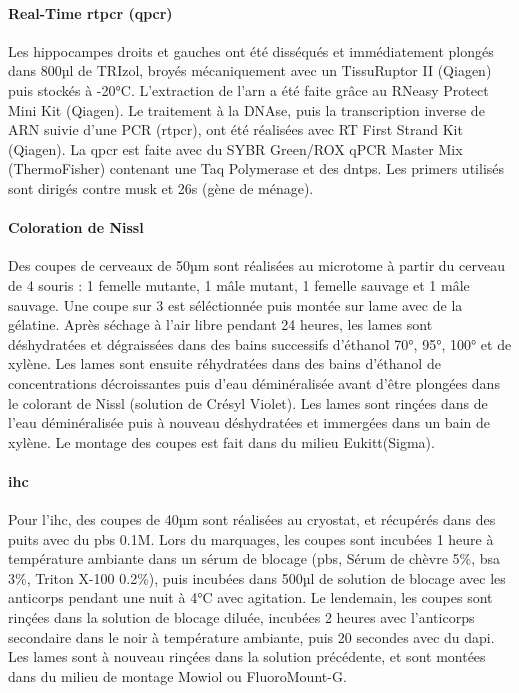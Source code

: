 \paragraph{Real-Time \acrshort{rtpcr} (\acrshort{qpcr})}
\label{par:qPCR}
	Les hippocampes droits et gauches ont été disséqués et immédiatement plongés dans 800µl de TRIzol\textregistered, broyés mécaniquement avec un TissuRuptor II (Qiagen\textregistered) puis stockés à -20°C. L'extraction de l'\acrshort{arn} a été faite grâce au RNeasy Protect Mini Kit (Qiagen\textregistered). Le traitement à la DNAse, puis la transcription inverse de ARN suivie d'une PCR (\acrshort{rtpcr}), ont été réalisées avec RT First Strand Kit (Qiagen\textregistered). La \gls{qpcr} est faite avec du SYBR Green/ROX qPCR Master Mix (ThermoFisher\textregistered) contenant une Taq Polymerase et des \glspl{dntp}. Les primers utilisés sont dirigés contre \gls{musk} et \acrshort{26s} (gène de ménage).
	
\paragraph{Coloration de Nissl}
\label{par:Nissl}
	Des coupes de cerveaux de 50µm sont réalisées au microtome à partir du cerveau de 4 souris : 1 femelle mutante, 1 mâle mutant, 1 femelle sauvage et 1 mâle sauvage. Une coupe sur 3 est séléctionnée puis montée sur lame avec de la gélatine. Après séchage à l'air libre pendant 24 heures, les lames sont déshydratées et dégraissées dans des bains successifs d'éthanol 70°, 95°, 100° et de xylène. Les lames sont ensuite réhydratées dans des bains d'éthanol de concentrations décroissantes puis d'eau déminéralisée avant d'être plongées dans le colorant de Nissl (solution de Crésyl Violet).  Les lames sont rinçées dans de l'eau déminéralisée puis à nouveau déshydratées et immergées dans un bain de xylène. Le montage des coupes est fait dans du milieu Eukitt\textregistered (Sigma).
	
\paragraph{\Acrlong{ihc}}	
\label{par:ihc}
	Pour l'\Gls{ihc}, des coupes de 40µm sont réalisées au cryostat, et récupérés dans des puits avec du \acrshort{pbs} 0.1M. Lors du marquages, les coupes sont incubées 1 heure à température ambiante dans un sérum de blocage (\acrshort{pbs}, Sérum de chèvre 5\%, \acrshort{bsa} 3\%, Triton X-100 0.2\%), puis  incubées dans 500µl de solution de blocage avec les anticorps pendant une nuit à 4°C avec agitation. Le lendemain, les coupes sont rinçées dans la solution de blocage diluée, incubées 2 heures avec l'anticorps secondaire dans le noir à température ambiante, puis 20 secondes avec du \gls{dapi}. Les lames sont à nouveau rinçées dans la solution précédente, et sont montées dans du milieu de montage Mowiol ou FluoroMount-G\textregistered.
	
